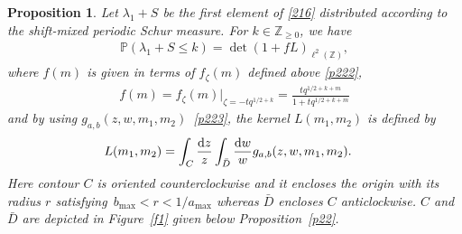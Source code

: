 \documentclass[pdftex]{sigma}
\numberwithin{equation}{section}
\newtheorem{Proposition}[Theorem]{Proposition}
 { \theoremstyle{definition}
\newtheorem{Definition}[Theorem]{Definition}
\newtheorem{Note}[Theorem]{Note}
\newtheorem{Example}[Theorem]{Example}
\newtheorem{Remark}[Theorem]{Remark} }
\def\l{\lambda}
\def\P{\mathbb{P}}
\def\Z{\mathbb{Z}}
\begin{document}
\begin{Proposition}\label{p25}
 Let $\l_1+S$ be the first element of \eqref{216} distributed according to the shift-mixed periodic Schur measure.
 For $k\in\Z_{\ge 0}$, we have
\begin{align} \label{p251}
 \P (\l_1+S\le k )
 =\det (1+f L )_{\ell^2(\Z)},
\end{align}
 where
 $f(m)$ is given in terms of
 $f_{\zeta}(m)$ defined above \eqref{p222},
\begin{align}
\label{p251-1}
 f(m)=f_{\zeta}(m)|_{\zeta=-tq^{1/2+k}}
 =\frac{tq^{1/2+k+m}}{1+tq^{1/2+k+m}}
\end{align}
and
by using $g_{a,b}(z,w,m_1,m_2)$~\eqref{p223},
the kernel
$L(m_1,m_2)$ is defined by
\begin{align}
&L(m_1,m_2)=
\int_C\frac{{\rm d}z}{z}\int_{\bar{D}}\frac{{\rm d}w}{w}
g_{a,b}(z,w,m_1,m_2).
\label{t252}
\end{align}
Here contour $C$ is oriented counterclockwise and it encloses the origin with its radius
$r$ satisfying~${b_{\max}<r<1/a_{\max}}$
whereas $\bar{D}$ encloses $C$
anticlockwise.
$C$ and $\bar{D}$ are depicted in Figure~{\rm\ref{f1}}
given below Proposition~{\rm\ref{p22}}.

\end{Proposition}
\end{document}
